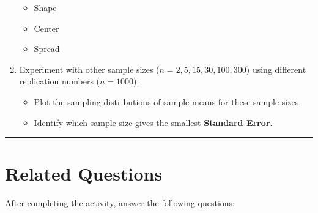 \documentclass[oneside,openany]{book}
\providecommand{\tightlist}{%
  \setlength{\itemsep}{0pt}\setlength{\parskip}{0pt}}
\begin{document}
\begin{enumerate}
  \begin{itemize}
  \tightlist
  \item
    Shape
  \item
    Center
  \item
    Spread
  \end{itemize}
\item
  Experiment with other sample sizes (\(n = 2, 5, 15, 30, 100, 300\)) using different replication numbers (\(n = 1000\)):

  \begin{itemize}
  \tightlist
  \item
    Plot the sampling distributions of sample means for these sample sizes.
  \item
    Identify which sample size gives the smallest \textbf{Standard Error}.
  \end{itemize}
\end{enumerate}

\begin{center}\rule{0.5\linewidth}{0.5pt}\end{center}

\section{Related Questions}\label{related-questions-2}

After completing the activity, answer the following questions:
\end{document}
